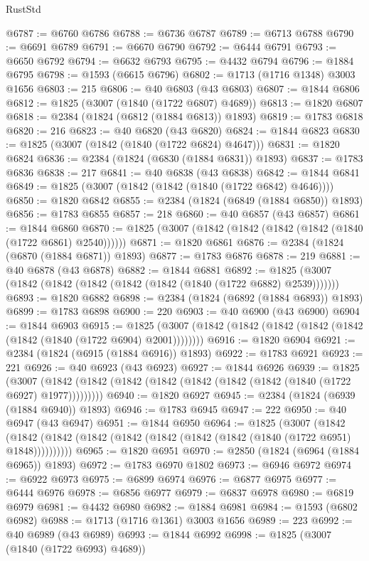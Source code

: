 \begin{lexlean}{RustStd}
\begin{coremodule}
{\begin{coremodule}
{{{{{{{{{{{{{{{{{{{{{{{{{{{{{{{{{{{{{{{{{{{{{{{@6787 := @6760 @6786
@6788 := @6736 @6787
@6789 := @6713 @6788
@6790 := @6691 @6789
@6791 := @6670 @6790
@6792 := @6444 @6791
@6793 := @6650 @6792
@6794 := @6632 @6793
@6795 := @4432 @6794
@6796 := @1884 @6795
@6798 := @1593 (@6615 @6796)
@6802 := @1713 (@1716 @1348) @3003 @1656
@6803 := 215
@6806 := @40 @6803 (@43 @6803)
@6807 := @1844 @6806
@6812 := @1825 (@3007 (@1840 (@1722 @6807) @4689))
@6813 := @1820 @6807
@6818 := @2384 (@1824 (@6812 (@1884 @6813)) @1893)
@6819 := @1783 @6818
@6820 := 216
@6823 := @40 @6820 (@43 @6820)
@6824 := @1844 @6823
@6830 := @1825 (@3007 (@1842 (@1840 (@1722 @6824) @4647)))
@6831 := @1820 @6824
@6836 := @2384 (@1824 (@6830 (@1884 @6831)) @1893)
@6837 := @1783 @6836
@6838 := 217
@6841 := @40 @6838 (@43 @6838)
@6842 := @1844 @6841
@6849 := @1825 (@3007 (@1842 (@1842 (@1840 (@1722 @6842) @4646))))
@6850 := @1820 @6842
@6855 := @2384 (@1824 (@6849 (@1884 @6850)) @1893)
@6856 := @1783 @6855
@6857 := 218
@6860 := @40 @6857 (@43 @6857)
@6861 := @1844 @6860
@6870 := @1825 (@3007 (@1842 (@1842 (@1842 (@1842 (@1840 (@1722 @6861) @2540))))))
@6871 := @1820 @6861
@6876 := @2384 (@1824 (@6870 (@1884 @6871)) @1893)
@6877 := @1783 @6876
@6878 := 219
@6881 := @40 @6878 (@43 @6878)
@6882 := @1844 @6881
@6892 := @1825 (@3007 (@1842 (@1842 (@1842 (@1842 (@1842 (@1840 (@1722 @6882) @2539)))))))
@6893 := @1820 @6882
@6898 := @2384 (@1824 (@6892 (@1884 @6893)) @1893)
@6899 := @1783 @6898
@6900 := 220
@6903 := @40 @6900 (@43 @6900)
@6904 := @1844 @6903
@6915 := @1825 (@3007 (@1842 (@1842 (@1842 (@1842 (@1842 (@1842 (@1840 (@1722 @6904) @2001))))))))
@6916 := @1820 @6904
@6921 := @2384 (@1824 (@6915 (@1884 @6916)) @1893)
@6922 := @1783 @6921
@6923 := 221
@6926 := @40 @6923 (@43 @6923)
@6927 := @1844 @6926
@6939 := @1825
    (@3007 (@1842 (@1842 (@1842 (@1842 (@1842 (@1842 (@1842 (@1840 (@1722 @6927) @1977)))))))))
@6940 := @1820 @6927
@6945 := @2384 (@1824 (@6939 (@1884 @6940)) @1893)
@6946 := @1783 @6945
@6947 := 222
@6950 := @40 @6947 (@43 @6947)
@6951 := @1844 @6950
@6964 := @1825
    (@3007
      (@1842 (@1842 (@1842 (@1842 (@1842 (@1842 (@1842 (@1842 (@1840 (@1722 @6951) @1848))))))))))
@6965 := @1820 @6951
@6970 := @2850 (@1824 (@6964 (@1884 @6965)) @1893)
@6972 := @1783 @6970 @1802
@6973 := @6946 @6972
@6974 := @6922 @6973
@6975 := @6899 @6974
@6976 := @6877 @6975
@6977 := @6444 @6976
@6978 := @6856 @6977
@6979 := @6837 @6978
@6980 := @6819 @6979
@6981 := @4432 @6980
@6982 := @1884 @6981
@6984 := @1593 (@6802 @6982)
@6988 := @1713 (@1716 @1361) @3003 @1656
@6989 := 223
@6992 := @40 @6989 (@43 @6989)
@6993 := @1844 @6992
@6998 := @1825 (@3007 (@1840 (@1722 @6993) @4689))
}}}}}}}}}}}}}}}}}}}}}}}}}}}}}}}}}}}}}}}}}}}}}}}
\end{coremodule}}
\end{coremodule}
\end{lexlean}
